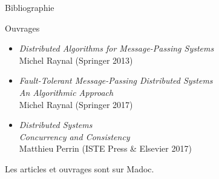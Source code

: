 
\begingroup

\begin{frame}{Bibliographie}

  \begin{block}{Ouvrages}
    \begin{itemize}
    \item
      \textit{Distributed Algorithms for Message-Passing Systems}\\
      Michel Raynal (Springer 2013)
    \item
      \textit{Fault-Tolerant Message-Passing Distributed Systems}\\
      \textit{An Algorithmic Approach}\\
      Michel Raynal (Springer 2017)
    \item
      \textit{Distributed Systems}\\
      \textit{Concurrency and Consistency}\\
      Matthieu Perrin (ISTE Press \& Elsevier 2017)
    \end{itemize}
  \end{block}
  
  \vfill
  \vfill
  
  \begin{citing}
  \item Les articles et ouvrages sont sur Madoc.
  \end{citing}

\end{frame}

\endgroup
\endinput
